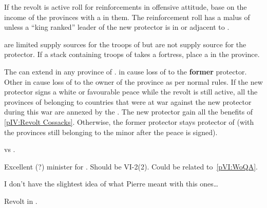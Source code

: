 \phadm
\aparag If the revolt is active \paysukraine roll for reinforcements in
offensive attitude, base on the income of the provinces with a \REVOLT in
them.
\bparag The reinforcement roll has a malus of  unless a ``king
ranked'' leader of the new protector is in or adjacent to \paysukraine.

\phmil
\aparag \REVOLT are limited supply sources for the troops of \paysukraine but
are not supply source for the protector.
\aparag If a stack containing troops of \paysukraine takes a fortress, place a
\REVOLT \facemoins in the province.

\phpaix
\aparag The \REVOLT can extend in any province of \regionUkraine.
\bparag \REVOLT in \paysUkraine cause loss of \STAB to the \textbf{former}
protector. Other \REVOLT in \regionUkraine cause loss of \STAB to the owner of
the province as per normal rules.
\aparag If the new protector signs a white or favourable peace while the
revolt is still active, all the provinces of \regionUkraine belonging to
countries that were at war against the new protector during this war are
annexed by the \MIN \paysukraine. The new protector gain all the benefits of
\ref{pIV:Revolt Cossacks}.
\aparag Otherwise, the former protector stays protector of \paysukraine (with
the provinces still belonging to the minor after the peace is signed).



\begin{todo}
  \SPA vs \paysNaples.
\end{todo}

\begin{todo}
  Excellent (?) minister for \HIS. Should be VI-2(2). Could be related
  to~\ref{pVI:WoQA}.
\end{todo}

\begin{todo}
  I don't have the slightest idea of what Pierre meant with this ones\ldots
\end{todo}

\begin{todo}
  Revolt in \paysAstrakhan.
\end{todo}


